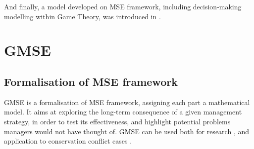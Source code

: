 \documentclass[12pt,a4paper]{article}
\begin{document}
And finally, a model developed on MSE framework, including decision-making modelling within Game Theory, was introduced in \cite{duthie2018}.

\section{GMSE}%

\subsection{Formalisation of MSE framework}

GMSE is a formalisation of MSE framework, assigning each part a mathematical model.
It aims at exploring the long-term consequence of a given management strategy, in order to test its effectiveness, and highlight potential problems managers would not have thought of.
GMSE can be used both for research \citep{cusack2018time}, and application to conservation conflict cases \citep{bainbridge2017goose}.
\end{document}
